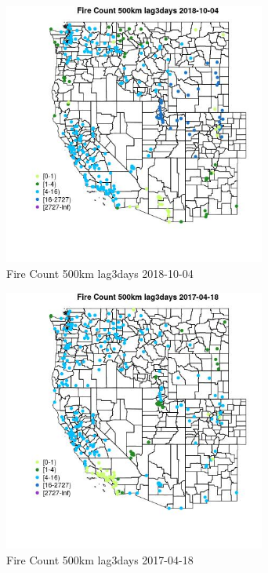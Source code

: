 \begin{figure} 
\centering  
\includegraphics[width=0.77\textwidth]{Code_Outputs/Report_ML_input_PM25_Step4_part_f_de_duplicated_aveswNAs_MapObsFire_Count_500km_lag3days2018-10-04.jpg} 
\caption{\label{fig:Report_ML_input_PM25_Step4_part_f_de_duplicated_aveswNAsMapObsFire_Count_500km_lag3days2018-10-04}Fire Count 500km lag3days 2018-10-04} 
\end{figure} 
 

\begin{figure} 
\centering  
\includegraphics[width=0.77\textwidth]{Code_Outputs/Report_ML_input_PM25_Step4_part_f_de_duplicated_aveswNAs_MapObsFire_Count_500km_lag3days2017-04-18.jpg} 
\caption{\label{fig:Report_ML_input_PM25_Step4_part_f_de_duplicated_aveswNAsMapObsFire_Count_500km_lag3days2017-04-18}Fire Count 500km lag3days 2017-04-18} 
\end{figure} 
 

